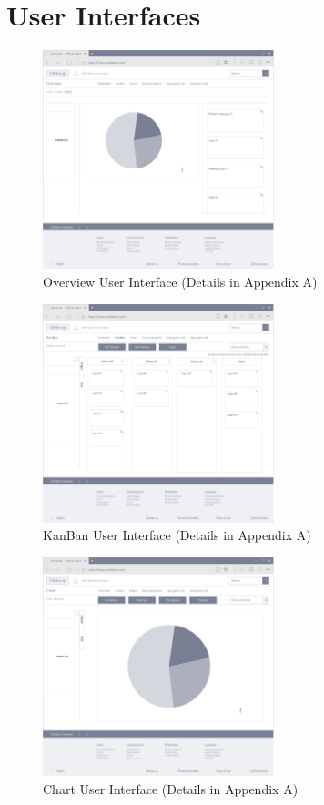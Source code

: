 \documentclass[12pt,a4paper]{report}
\begin{document}
\section{User Interfaces}
\begin{figure}[H]
	\centering
	\includegraphics[width=0.6\textwidth]{./pics/OverviewInterface.png}
	\caption{Overview User Interface (Details in Appendix A)}
\end{figure}
\begin{figure}[H]
	\centering
	\includegraphics[width=0.6\textwidth]{./pics/KanbanInterface.png}
	\caption{KanBan User Interface (Details in Appendix A)}
\end{figure}
\begin{figure}[H]
	\centering
	\includegraphics[width=0.6\textwidth]{./pics/ChartInterface.png}
	\caption{Chart User Interface (Details in Appendix A)}
\end{figure}
\end{document}
